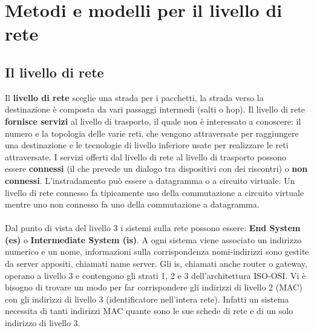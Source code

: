 \documentclass{article}
\begin{document}
\section{Metodi e modelli per il livello di rete}
\subsection{Il livello di rete}
Il \textbf{livello di rete} sceglie una strada per i pacchetti, la strada verso la destinazione è composta da vari passaggi intermedi (salti o hop). Il livello di rete \textbf{fornisce servizi} al livello di trasporto, il quale non è interessato a conoscere: il numero e la topologia delle varie reti, che vengono attraversate per raggiungere una destinazione e le tecnologie di livello inferiore usate per realizzare le reti attraversate. I servizi offerti dal livello di rete al livello di trasporto possono essere \textbf{connessi} (il che prevede un dialogo tra dispositivi con dei riscontri) o \textbf{non connessi}. L'instradamento può essere a datagramma o a circuito virtuale. Un livello di rete connesso fa tipicamente uso della commutazione a circuito virtuale mentre uno non connesso fa uno della commutazione a datagramma.\\\\
Dal punto di vista del livello 3 i sistemi sulla rete possono essere: \textbf{End System (es)} o \textbf{Intermediate System (is)}. A ogni sistema viene associato un indirizzo numerico e un nome, informazioni sulla corrispondenza nomi-indirizzi sono gestite da server appositi, chiamati name server. Gli is, chiamati anche router o gateway, operano a livello 3 e contengono gli strati 1, 2 e 3 dell'architettura ISO-OSI. Vi è bisogno di trovare un modo per far corrispondere gli indirizzi di livello 2 (MAC) con gli indirizzi di livello 3 (identificatore nell'intera rete). Infatti un sistema necessita di tanti indirizzi MAC quante sono le sue schede di rete e di un solo indirizzo di livello 3.
\end{document}
